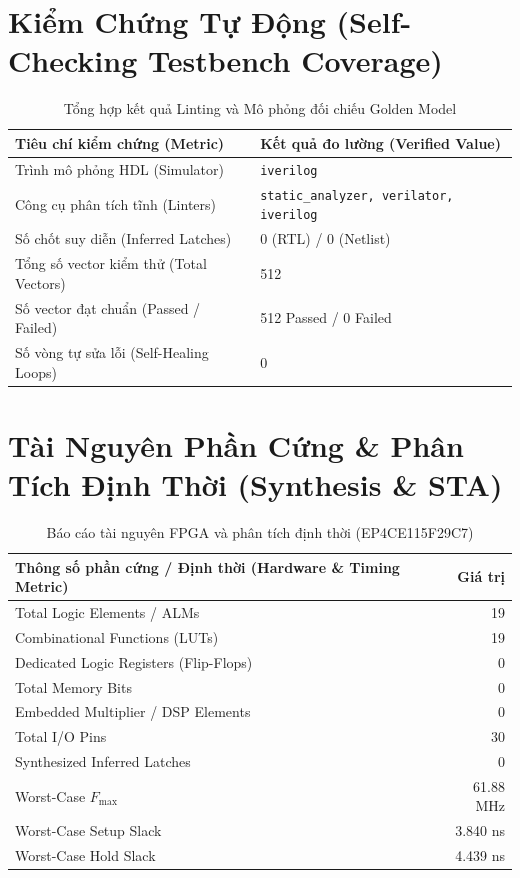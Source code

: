 \documentclass[11pt,a4paper]{article}
\begin{document}
\section{Kiểm Chứng Tự Động (Self-Checking Testbench Coverage)}
\begin{table}[H]
    \centering
    \small
    \caption{Tổng hợp kết quả Linting và Mô phỏng đối chiếu Golden Model}
    \begin{tabularx}{\textwidth}{@{}lX@{}}
        \toprule
        \textbf{Tiêu chí kiểm chứng (Metric)} & \textbf{Kết quả đo lường (Verified Value)} \\
        \midrule
        Trình mô phỏng HDL (Simulator) & \texttt{iverilog} \\
        Công cụ phân tích tĩnh (Linters) & \texttt{static\_analyzer, verilator, iverilog} \\
        Số chốt suy diễn (Inferred Latches) & 0 (RTL) / 0 (Netlist) \\
        Tổng số vector kiểm thử (Total Vectors) & 512 \\
        Số vector đạt chuẩn (Passed / Failed) & 512 Passed / 0 Failed \\
        Số vòng tự sửa lỗi (Self-Healing Loops) & 0 \\
        \bottomrule
    \end{tabularx}
\end{table}

\section{Tài Nguyên Phần Cứng \& Phân Tích Định Thời (Synthesis \& STA)}
\begin{table}[H]
    \centering
    \small
    \caption{Báo cáo tài nguyên FPGA và phân tích định thời (EP4CE115F29C7)}
    \begin{tabularx}{\textwidth}{@{}Xr@{}}
        \toprule
        \textbf{Thông số phần cứng / Định thời (Hardware \& Timing Metric)} & \textbf{Giá trị} \\
        \midrule
        Total Logic Elements / ALMs & 19 \\
        Combinational Functions (LUTs) & 19 \\
        Dedicated Logic Registers (Flip-Flops) & 0 \\
        Total Memory Bits & 0 \\
        Embedded Multiplier / DSP Elements & 0 \\
        Total I/O Pins & 30 \\
        Synthesized Inferred Latches & 0 \\
        Worst-Case $F_{\max}$ & 61.88 MHz \\
        Worst-Case Setup Slack & 3.840 ns \\
        Worst-Case Hold Slack & 4.439 ns \\
        \bottomrule
    \end{tabularx}
\end{table}
\end{document}
